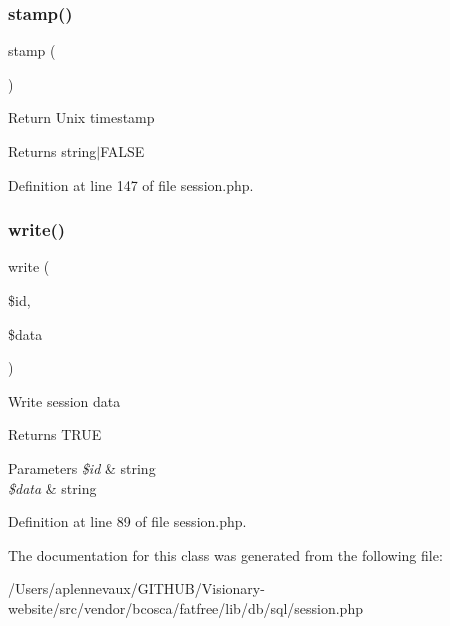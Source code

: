 \subsubsection{\texorpdfstring{stamp()}{stamp()}}
{\footnotesize\ttfamily stamp (\begin{DoxyParamCaption}{ }\end{DoxyParamCaption})}

Return Unix timestamp \begin{DoxyReturn}{Returns}
string$\vert$\+F\+A\+L\+SE 
\end{DoxyReturn}


Definition at line 147 of file session.\+php.

\hypertarget{class_d_b_1_1_s_q_l_1_1_session_a5f277b5f0e4e2154cddc9a3a0d2bf57d}{}\label{class_d_b_1_1_s_q_l_1_1_session_a5f277b5f0e4e2154cddc9a3a0d2bf57d} 
\subsubsection{\texorpdfstring{write()}{write()}}
{\footnotesize\ttfamily write (\begin{DoxyParamCaption}\item[{}]{\$id,  }\item[{}]{\$data }\end{DoxyParamCaption})}

Write session data \begin{DoxyReturn}{Returns}
T\+R\+UE 
\end{DoxyReturn}

\begin{DoxyParams}{Parameters}
{\em \$id} & string \\
\hline
{\em \$data} & string \\
\hline
\end{DoxyParams}


Definition at line 89 of file session.\+php.



The documentation for this class was generated from the following file\+:\begin{DoxyCompactItemize}
\item 
/\+Users/aplennevaux/\+G\+I\+T\+H\+U\+B/\+Visionary-\/website/src/vendor/bcosca/fatfree/lib/db/sql/session.\+php\end{DoxyCompactItemize}
